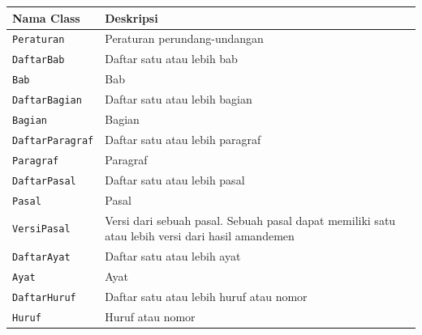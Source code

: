 \begin{longtable}[l]{|p{}|p{}|}
  \hline
  Nama Class              & Deskripsi                                                                                       \\ \hline \endhead
  \texttt{Peraturan}      & Peraturan perundang-undangan                                                                    \\ \hline
  \texttt{DaftarBab}      & Daftar satu atau lebih bab                                                                      \\ \hline
  \texttt{Bab}            & Bab                                                                                             \\ \hline
  \texttt{DaftarBagian}   & Daftar satu atau lebih bagian                                                                   \\ \hline
  \texttt{Bagian}         & Bagian                                                                                          \\ \hline
  \texttt{DaftarParagraf} & Daftar satu atau lebih paragraf                                                                 \\ \hline
  \texttt{Paragraf}       & Paragraf                                                                                        \\ \hline
  \texttt{DaftarPasal}    & Daftar satu atau lebih pasal                                                                    \\ \hline
  \texttt{Pasal}          & Pasal                                                                                           \\ \hline
  \texttt{VersiPasal}     & Versi dari sebuah pasal. Sebuah pasal dapat memiliki satu atau lebih versi dari hasil amandemen \\ \hline
  \texttt{DaftarAyat}     & Daftar satu atau lebih ayat                                                                     \\ \hline
  \texttt{Ayat}           & Ayat                                                                                            \\ \hline
  \texttt{DaftarHuruf}    & Daftar satu atau lebih huruf atau nomor                                                         \\ \hline
  \texttt{Huruf}          & Huruf atau nomor                                                                                \\ \hline

\end{longtable}
